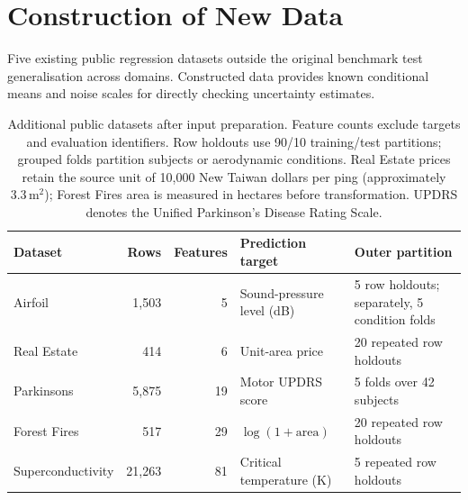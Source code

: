 \section{Construction of New Data}
\label{sec:new-data}

Five existing public regression datasets outside the original benchmark test generalisation across domains.
Constructed data provides known conditional means and noise scales for directly checking uncertainty estimates.

\begin{table}[t]
\centering
\small
\setlength{\tabcolsep}{4pt}
\begin{tabularx}{\textwidth}{@{}lrrlX@{}}
\toprule
Dataset & Rows & Features & Prediction target & Outer partition \\
\midrule
Airfoil & 1{,}503 & 5 & Sound-pressure level (dB) & 5 row holdouts; separately, 5 condition folds \\
Real Estate & 414 & 6 & Unit-area price & 20 repeated row holdouts \\
Parkinsons & 5{,}875 & 19 & Motor UPDRS score & 5 folds over 42 subjects \\
Forest Fires & 517 & 29 & $\log(1+\mathrm{area})$ & 20 repeated row holdouts \\
Superconductivity & 21{,}263 & 81 & Critical temperature (K) & 5 repeated row holdouts \\
\bottomrule
\end{tabularx}
\caption{Additional public datasets after input preparation.
Feature counts exclude targets and evaluation identifiers.
Row holdouts use 90/10 training/test partitions; grouped folds partition subjects or aerodynamic conditions.
Real Estate prices retain the source unit of 10{,}000 New Taiwan dollars per ping (approximately $3.3\,\mathrm{m}^2$); Forest Fires area is measured in hectares before transformation.
UPDRS denotes the Unified Parkinson's Disease Rating Scale.}
\label{tab:new-data-overview}
\end{table}

